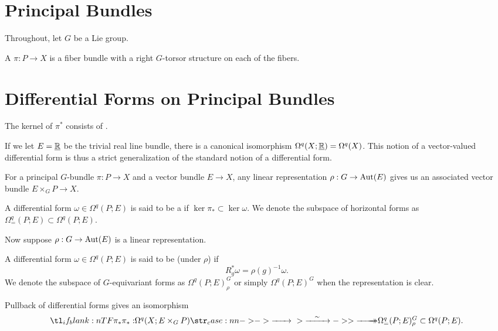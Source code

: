 \section{Principal Bundles}

Throughout, let $G$ be a Lie group.

\begin{definition}
  A  $\pi : P \to X$ is a fiber bundle with a right $G$-torsor structure on each of the fibers.
\end{definition}

\pagebreak
\section{Differential Forms on Principal Bundles}

The kernel of $\pi^*$ consists of .

If we let $E=\underline{\mathbb{R}}$ be the trivial real line bundle, there is a canonical isomorphism $\Omega^q(X; \underline{\mathbb{R}}) = \Omega^q(X)$. This notion of a vector-valued differential form is thus a strict generalization of the standard notion of a differential form.

For a principal $G$-bundle $\pi : P \to X$ and a vector bundle $E\to X$, any linear representation $\rho : G \to \operatorname{Aut}(E)$ gives us an associated vector bundle $E\times_G P \to X$.

\begin{definition}
  A differential form $\omega\in \Omega^q(P; E)$ is said to be a  if $\ker\pi_* \subset \ker \omega$. We denote the subspace of horizontal forms as $\Omega^q_=(P; E) \subset \Omega^q(P; E)$.
\end{definition}

Now suppose $\rho : G \to \operatorname{Aut}(E)$ is a linear representation. 
\begin{definition}
  A differential form $\omega\in \Omega^q(P; E)$ is said to be  (under $\rho$) if
  \[
    R_g^*\omega = \rho(g)^{-1}\omega.
  \]
  We denote the subspace of $G$-equivariant forms as $\Omega^q(P; E)^G_\rho$ or simply $\Omega^q(P; E)^G$ when the representation is clear.
\end{definition}

\begin{proposition}\label{prop:principal_descent_conditions}
  Pullback of differential forms gives an isomorphism
  \[
    \lkxfunc{\pi_*}{\Omega^q(X; E\times_{G} P)}{\Omega^q_=(P; E)^G_\rho \subset \Omega^q(P; E).}
  \]
\end{proposition}

